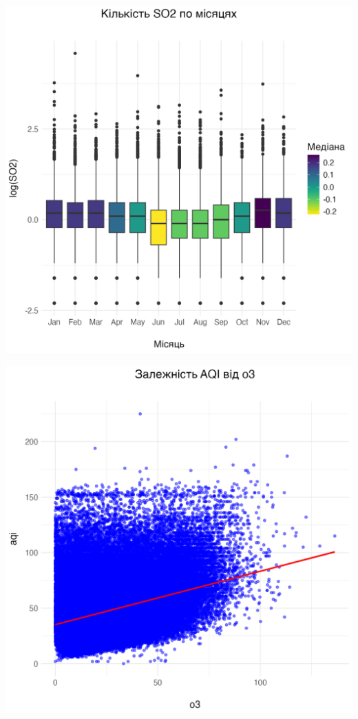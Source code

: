 \documentclass[./report.tex]{subfiles}
\begin{document}
\begin{enumerate}
  \includegraphics[width=\linewidth]{plots/question2/seasonal_so2.png}

  \includegraphics[width=\linewidth]{plots/question2/scatter_plot.png}


\end{enumerate}
\end{document}
